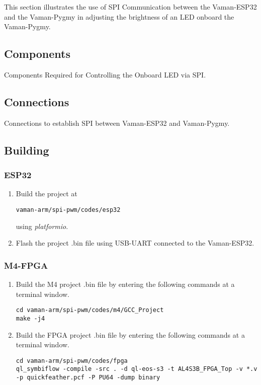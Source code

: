 This section illustrates the use of SPI Communication between the Vaman-ESP32
and the Vaman-Pygmy in adjusting the brightness of an LED onboard the 
Vaman-Pygmy.

\subsection{Components}
\begin{table}[!ht]
    \centering
    
    \caption{Components Required for Controlling the Onboard LED via SPI.}
    \label{tab:spi-pwm-components}
\end{table}

\subsection{Connections}
\begin{table}[!ht]
    \centering
    
    \caption{Connections to establish SPI between Vaman-ESP32 and Vaman-Pygmy.}
    \label{tab:spi-pwm-connections}
\end{table}

\subsection{Building}
\subsubsection{ESP32}
\begin{enumerate}
    \item Build the project at
    \begin{lstlisting}
vaman-arm/spi-pwm/codes/esp32
    \end{lstlisting}
    using \emph{platformio}.
    \item Flash the project .bin file using USB-UART connected to the 
    Vaman-ESP32. 
\end{enumerate}

\subsubsection{M4-FPGA}
\begin{enumerate}
    \item Build the M4 project .bin file by entering the following commands at a
    terminal window.
    \begin{lstlisting}
cd vaman-arm/spi-pwm/codes/m4/GCC_Project
make -j4
    \end{lstlisting}
    \item Build the FPGA project .bin file by entering the following commands at
    a terminal window.
    \begin{lstlisting}
cd vaman-arm/spi-pwm/codes/fpga
ql_symbiflow -compile -src . -d ql-eos-s3 -t AL4S3B_FPGA_Top -v *.v -p quickfeather.pcf -P PU64 -dump binary
    \end{lstlisting}
\end{enumerate}

